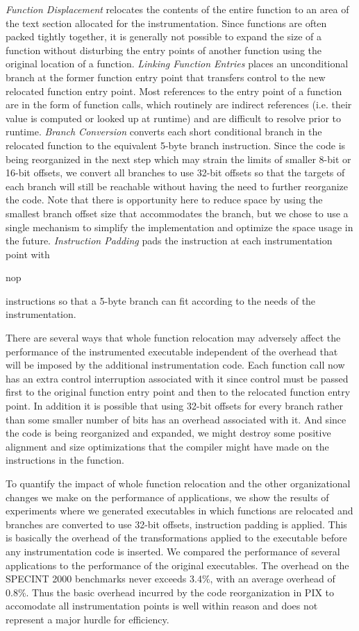 \textit{Function Displacement} relocates the contents of the entire function to an area of the text section allocated
for the instrumentation. Since functions are often packed tightly together, it is generally not possible to
expand the size of a function without disturbing the entry points of another function using the original location of a function. 
\textit{Linking Function Entries} places an unconditional branch at the former function entry point that transfers control
to the new relocated function entry point. Most references to the entry point of a function are in the form of function calls, which
routinely are indirect references (i.e. their value is computed or looked up at runtime) and are difficult to resolve
prior to runtime. \textit{Branch Conversion} converts each short conditional branch in the relocated function to the equivalent
5-byte branch instruction. Since the code is being reorganized in the next step which may strain the limits of
smaller 8-bit or 16-bit offsets, we convert all branches to use 32-bit offsets so that the targets of each branch
will still be reachable without having the need to further reorganize the code. Note that there is opportunity
here to reduce space by using the smallest branch offset size that accommodates the branch, but we chose to use a single 
mechanism to simplify the implementation and optimize the space usage in the future. \textit{Instruction Padding} pads
the instruction at each instrumentation point with \begin{it}nop\end{it} instructions so that a 5-byte branch can fit
 according to the needs of the instrumentation. 

There are several ways that whole function relocation may adversely affect 
the performance of the instrumented executable independent of the overhead
that will be imposed by the additional instrumentation code. Each function call
now has an extra control interruption associated with it since control must be passed first to the original function entry
point and then to the relocated function entry point. In addition it is possible that using 32-bit offsets for every branch rather than
some smaller number of bits has an overhead associated with it. And since the code is being reorganized and expanded, 
we might destroy some positive alignment and size optimizations that the compiler might have made on the instructions in the
function.

To quantify the impact of whole function relocation and the other organizational changes we make
on the performance of applications, we show the results of experiments
where we generated executables in which functions are relocated and branches are converted to use 32-bit offsets, 
instruction padding is applied. This is basically the overhead of the transformations applied to the executable 
before any instrumentation code is inserted. We compared the performance of several applications to
the performance of the original executables. The overhead on the SPECINT 2000 benchmarks never exceeds 3.4\%, with an average
overhead of 0.8\%. Thus the basic overhead incurred by the code reorganization in PIX to accomodate all instrumentation points is
well within reason and does not represent a major hurdle for efficiency.

